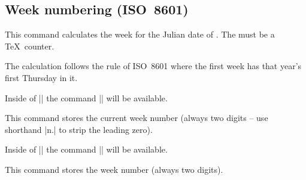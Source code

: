 \subsection{Week numbering (ISO~8601)}
\label{calendar:weeknumbering}
\begin{command}{\pgfcalendarjulianyeartoweek{}}
  This command calculates the week for the Julian date of .
  The  must be a \TeX\ counter.

  The calculation follows the rule of ISO~8601 where the first week has that
  year's first Thursday in it.
\end{command}

Inside of |\pgfcalendar| the command |\pgfcalendarcurrentweek| will be available.
\begin{command}{\pgfcalendarcurrentweek}
  This command stores the current week number (always two digits -- use shorthand |n.|
  to strip the leading zero).
\end{command}

Inside of |\ifdate| the command |\pgfcalendarifdateweek| will be available.
\begin{command}{\pgfcalendarifdateweek}
  This command stores the week number (always two digits).
\end{command}